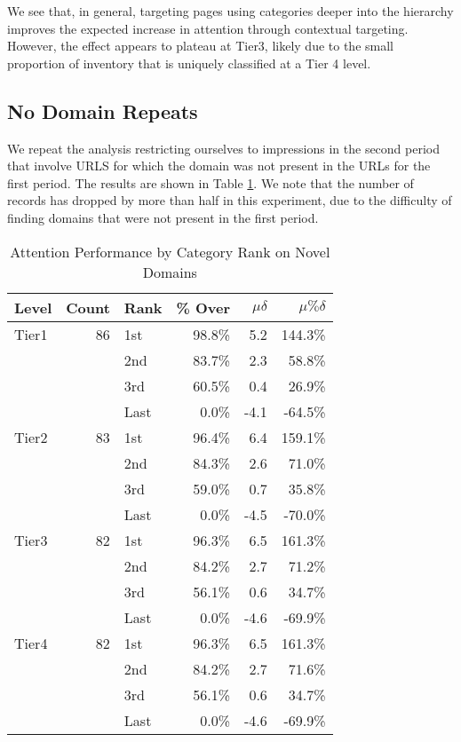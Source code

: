 \documentclass[sigconf]{acmart}
\begin{document}
We see that, in general, targeting pages using categories deeper into the hierarchy
improves the expected increase in attention through contextual targeting.
However, the effect appears to plateau at Tier3, likely due to the small proportion of inventory
that is uniquely classified at a Tier 4 level.

\subsection{No Domain Repeats}
We repeat the analysis restricting ourselves to impressions in the second period
that involve URLS for which the domain was not present in the URLs for the first period.
The results are shown in Table \ref{tab:nodomainrepeats}.
We note that the number of records has dropped by
more than half in this experiment, due to the difficulty of finding domains that were
not present in the first period.

\begin{table}
\caption{Attention Performance by Category Rank on Novel Domains}
\label{tab:nodomainrepeats}
\begin{tabular}{|l|r|l|r|r|r|}
\toprule
Level   &Count  &Rank &\% Over  &$\mu\delta$  &$\mu\%\delta$        \\
\midrule
Tier1   &86       &1st  &98.8\%     &5.2         &144.3\%     \\
        &         &2nd  &83.7\%     &2.3         &58.8\%     \\
        &         &3rd  &60.5\%     &0.4         &26.9\%     \\
        &         &Last &0.0\%      &-4.1        &-64.5\%     \\
Tier2   &83       &1st  &96.4\%     &6.4         &159.1\%     \\
        &         &2nd  &84.3\%     &2.6         &71.0\%     \\
        &         &3rd  &59.0\%     &0.7         &35.8\%     \\
        &         &Last &0.0\%      &-4.5        &-70.0\%     \\
Tier3   &82       &1st  &96.3\%     &6.5         &161.3\%     \\
        &         &2nd  &84.2\%     &2.7         &71.2\%     \\
        &         &3rd  &56.1\%     &0.6         &34.7\%     \\
        &         &Last &0.0\%      &-4.6        &-69.9\%     \\
Tier4   &82       &1st  &96.3\%     &6.5         &161.3\%     \\
        &         &2nd  &84.2\%     &2.7         &71.6\%     \\
        &         &3rd  &56.1\%     &0.6         &34.7\%     \\
        &         &Last &0.0\%      &-4.6        &-69.9\%     \\
\bottomrule
\end{tabular}
\end{table}
\end{document}
